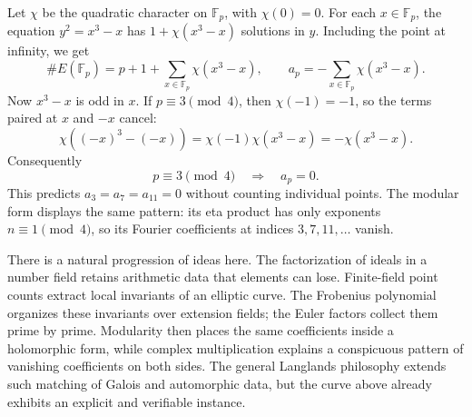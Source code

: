 Let \(\chi\) be the quadratic character on \(\mathbb F_p\), with \(\chi(0)=0\). For each \(x\in\mathbb F_p\), the equation
\(y^2=x^3-x\) has \(1+\chi(x^3-x)\) solutions in \(y\). Including the point at infinity, we get
\[
 \#E(\mathbb F_p)
 =p+1+\sum_{x\in\mathbb F_p}\chi(x^3-x),
 \qquad
 a_p=-\sum_{x\in\mathbb F_p}\chi(x^3-x).
\]
Now \(x^3-x\) is odd in \(x\). If \(p\equiv3\pmod4\), then \(\chi(-1)=-1\), so the terms paired at \(x\) and \(-x\) cancel:
\[
 \chi((-x)^3-(-x))
 =\chi(-1)\chi(x^3-x)
 =-\chi(x^3-x).
\]
Consequently
\[
 \boxed{p\equiv3\pmod4\quad\Longrightarrow\quad a_p=0.}
\]
This predicts \(a_3=a_7=a_{11}=0\) without counting individual points. The modular form displays the same pattern: its eta product has only exponents \(n\equiv1\pmod4\), so its Fourier coefficients at indices \(3,7,11,\ldots\) vanish.

There is a natural progression of ideas here. The factorization of ideals in a number field retains arithmetic data that elements can lose. Finite-field point counts extract local invariants of an elliptic curve. The Frobenius polynomial organizes these invariants over extension fields; the Euler factors collect them prime by prime. Modularity then places the same coefficients inside a holomorphic form, while complex multiplication explains a conspicuous pattern of vanishing coefficients on both sides. The general Langlands philosophy extends such matching of Galois and automorphic data, but the curve above already exhibits an explicit and verifiable instance.
